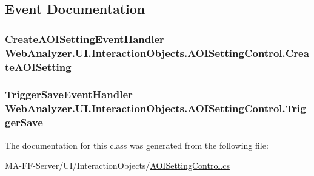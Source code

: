 \subsection{Event Documentation}
\hypertarget{class_web_analyzer_1_1_u_i_1_1_interaction_objects_1_1_a_o_i_setting_control_a655f9d463578bed0ae1ce3243eee82c0}{}
\subsubsection[{Create\+A\+O\+I\+Setting}]{\setlength{\rightskip}{0pt plus 5cm}Create\+A\+O\+I\+Setting\+Event\+Handler Web\+Analyzer.\+U\+I.\+Interaction\+Objects.\+A\+O\+I\+Setting\+Control.\+Create\+A\+O\+I\+Setting}\label{class_web_analyzer_1_1_u_i_1_1_interaction_objects_1_1_a_o_i_setting_control_a655f9d463578bed0ae1ce3243eee82c0}
\hypertarget{class_web_analyzer_1_1_u_i_1_1_interaction_objects_1_1_a_o_i_setting_control_a752fb801d539bc3df62f41bb854074e2}{}
\subsubsection[{Trigger\+Save}]{\setlength{\rightskip}{0pt plus 5cm}Trigger\+Save\+Event\+Handler Web\+Analyzer.\+U\+I.\+Interaction\+Objects.\+A\+O\+I\+Setting\+Control.\+Trigger\+Save}\label{class_web_analyzer_1_1_u_i_1_1_interaction_objects_1_1_a_o_i_setting_control_a752fb801d539bc3df62f41bb854074e2}


The documentation for this class was generated from the following file\+:\begin{DoxyCompactItemize}
\item 
M\+A-\/\+F\+F-\/\+Server/\+U\+I/\+Interaction\+Objects/\hyperlink{_a_o_i_setting_control_8cs}{A\+O\+I\+Setting\+Control.\+cs}\end{DoxyCompactItemize}
